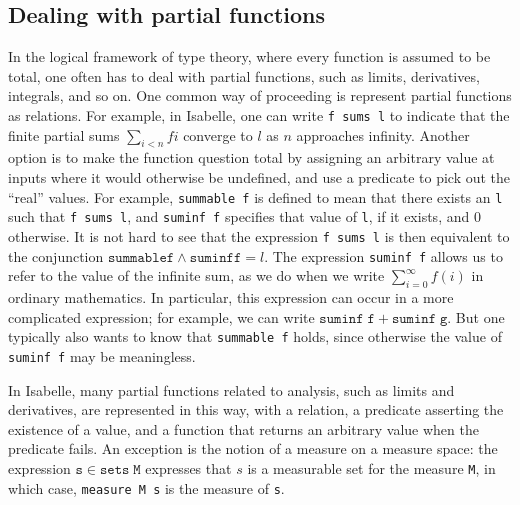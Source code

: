\documentclass{svjour3}
\begin{document}
\subsection{Dealing with partial functions}

In the logical framework of type theory, where every function is assumed to be total, one often has to deal with partial functions, such as limits, derivatives, integrals, and so on. One common way of proceeding is represent partial functions as relations. For example, in Isabelle, one can write \texttt{f sums l} to indicate that the finite partial sums $\sum_{i < n} f i$ converge to $l$ as $n$ approaches infinity. Another option is to make the function question total by assigning an arbitrary value at inputs where it would otherwise be undefined, and use a predicate to pick out the ``real'' values. For example, \texttt{summable f} is defined to mean that there exists an \texttt{l} such that \texttt{f sums l}, and \texttt{suminf f} specifies that value of \texttt{l}, if it exists, and $0$ otherwise. It is not hard to see that the expression \texttt{f sums l} is then equivalent to the conjunction $\mathtt{summable f} \wedge \mathtt{suminf f } = l$. The expression \texttt{suminf f} allows us to refer to the value of the infinite sum, as we do when we write $\sum_{i = 0}^\infty f(i)$ in ordinary mathematics. In particular, this expression can occur in a more complicated expression; for example, we can write $\mathtt{suminf \; f} + \mathtt{suminf \; g}$. But one typically also wants to know that \texttt{summable f} holds, since otherwise the value of \texttt{suminf f} may be meaningless.

In Isabelle, many partial functions related to analysis, such as limits and derivatives, are represented in this way, with a relation, a predicate asserting the existence of a value, and a function that returns an arbitrary value when the predicate fails. An exception is the notion of a measure on a measure space: the expression $\mathtt{s} \in \mathtt{sets \; M}$ expresses that $s$ is a measurable set for the measure \texttt{M}, in which case, \texttt{measure M s} is the measure of \texttt{s}.
\end{document}
